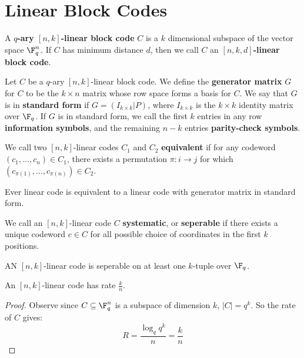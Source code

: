 \section{Linear Block Codes}

\begin{definition}
  A \textbf{$q$-ary $[n,k]$-linear block code} $C$ is a $k$ dimensional
  subspace of the vector space $\F_q^n$. If $C$ has minimum distance $d$,
  then we call $C$ an \textbf{$[n,k,d]$-linear block code}.
\end{definition}

\begin{definition}
  Let $C$ be a  $q$-ary  $[n,k]$-linear block code. We define the
  \textbf{generator matrix} $G$ for $C$ to be the $k \times n$ matrix whose
  row space forms a basis for $C$. We say that $G$ is in  \textbf{standard
  form}  if $G=(I_{k \times k} | P)$, where $I_{k \times k}$ is the $k
  \times k$ identity matrix over $\F_q$. If $G$ is in standard form, we
  call the first $k$ entries in any row  \textbf{information symbols}, and
  the remaining $n-k$ entries  \textbf{parity-check symbols}.
\end{definition}

\begin{definition}
  We call two $[n,k]$-linear codes $C_1$ and $C_2$ \textbf{equivalent} if
  for any codeword $(c_1, \dots, c_n) \in C_1$, there exists a permutation
  $\pi:i \xrightarrow{} j$ for which $(c_{\pi(1)}, \dots, c_{\pi(n)}) \in
  C_2$.
\end{definition}

\begin{lemma}\label{lemma_1.2.1}
  Ever linear code is equivalent to a linear code with generator matrix in
  standard form.
\end{lemma}

\begin{definition}
  We call an $[n,k]$-linear code $C$ \textbf{systematic}, or
  \textbf{seperable} if there exists a unique codeword $c \in C$ for all
  possible choice of coordinates in the first $k$ positions.
\end{definition}

\begin{lemma}\label{lemma_1.2.2}
  AN $[n,k]$-linear code is seperable on at least one $k$-tuple over
  $\F_q$.
\end{lemma}

\begin{lemma}\label{lemma_1.2.3}
  An $[n,k]$-linear code has rate $\frac{k}{n}$.
\end{lemma}
\begin{proof}
  Observe since $C \subseteq \F_q^n$ is a subspace of dimension $k$,
  $|C|=q^k$. So the rate of $C$ gives:
  \begin{equation*}
    R=\frac{\log_q{q^k}}{n}=\frac{k}{n}
  \end{equation*}
\end{proof}

